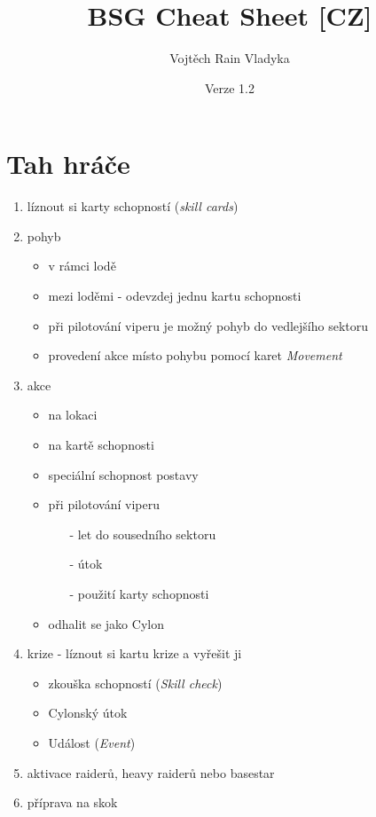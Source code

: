 \documentclass[a4paper,twocolumn]{article}
\begin{document}
\renewcommand{\arraystretch}{1.5}

\footnotesize

\title{BSG Cheat Sheet [CZ]}
\author{Vojtěch Rain Vladyka}
\date{Verze 1.2}

\maketitle

\section{Tah hráče}
\begin{enumerate}
\item líznout si karty schopností (\emph{skill cards})
\item pohyb 
	\begin{itemize}
	\item v rámci lodě 
	\item mezi loděmi - odevzdej jednu kartu schopnosti
	\item při pilotování viperu je možný pohyb do vedlejšího sektoru
	\item provedení akce místo pohybu pomocí karet \emph{Movement}
	\end{itemize}
\item akce 
	\begin{itemize}
	\item na lokaci
	\item na kartě schopnosti
	\item speciální schopnost postavy
	\item při pilotování viperu
		\begin{itemize}
		\item[-] let do sousedního sektoru
		\item[-] útok
		\item[-] použití karty schopnosti
		\end{itemize}
	\item odhalit se jako Cylon
	\end{itemize}
\item krize - líznout si kartu krize a vyřešit ji
	\begin{itemize}
	\item zkouška schopností (\emph{Skill check})
	\item Cylonský útok
	\item Událost (\emph{Event})
	\end{itemize}
\item aktivace raiderů, heavy raiderů nebo basestar
\item příprava na skok
\end{enumerate}
\end{document}
